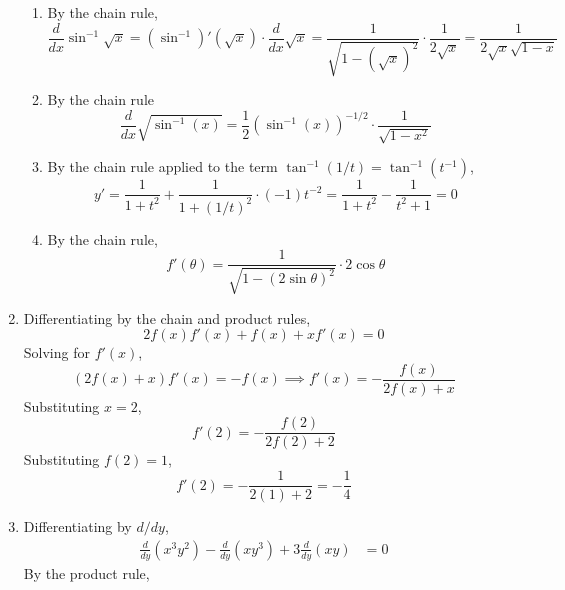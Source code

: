 \documentclass{article}
\begin{document}
\begin{enumerate}
  \begin{enumerate}
  \item By the chain rule,
    \begin{equation*}
      \frac{d}{dx} \sin^{-1}\sqrt{x} = (\sin^{-1})' (\sqrt{x}) \cdot
      \frac{d}{dx} \sqrt{x}
      = \frac{1}{\sqrt{1-(\sqrt{x})^2}} \cdot \frac{1}{2\sqrt{x}}
      = \frac{1}{2\sqrt{x}\sqrt{1-x}}
    \end{equation*}
  \item By the chain rule
    \begin{equation*}
      \frac{d}{dx} \sqrt{\sin^{-1}(x)}
      = \frac{1}{2} (\sin^{-1}(x))^{-1/2} \cdot \frac{1}{\sqrt{1-x^2}}
    \end{equation*}
  \item By the chain rule applied to the term $\tan^{-1}(1/t) =
    \tan^{-1}(t^{-1})$, 
    \begin{equation*}
      y' = \frac{1}{1+t^2} + \frac{1}{1+(1/t)^2} \cdot (-1)t^{-2}
      = \frac{1}{1+t^2} -\frac{1}{t^2+1} = 0
    \end{equation*}
  \item By the chain rule,
    \begin{equation*}
      f'(\theta) 
      = \frac{1}{\sqrt{1-(2\sin\theta)^2}} \cdot 2\cos \theta
    \end{equation*}
  \end{enumerate}
\item %
  Differentiating by the chain and product rules,
  \begin{equation*}
    2f(x)f'(x) + f(x) + xf'(x) = 0
  \end{equation*}
  Solving for $f'(x)$,
  \begin{equation*}
    (2f(x)+x)f'(x) = -f(x) \implies f'(x) = -\frac{f(x)}{2f(x)+x}
  \end{equation*}
  Substituting $x=2$,
  \begin{equation*}
    f'(2) = -\frac{f(2)}{2f(2)+2}
  \end{equation*}
  Substituting $f(2)=1$,
  \begin{equation*}
    f'(2) = -\frac{1}{2(1)+2} = -\frac{1}{4}
  \end{equation*}
\item %
  Differentiating by $d/dy$,
  \begin{align*}
    \frac{d}{dy} (x^3y^2) - \frac{d}{dy} (xy^3) + 3\frac{d}{dy}(xy) &=
    0
  \end{align*}
  By the product rule,
  \begin{align*}

\end{align*}
\end{enumerate}
\end{document}
